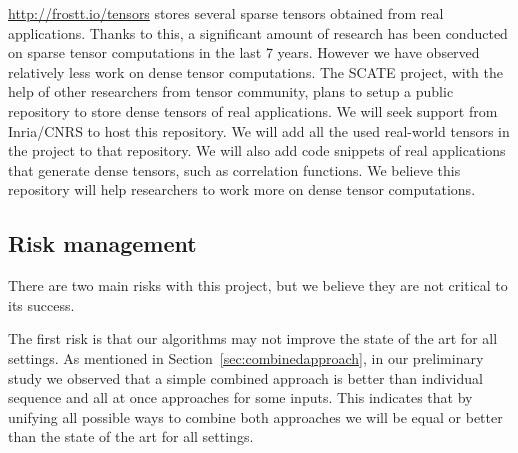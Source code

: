 \documentclass[a4paper,11pt]{article}
\begin{document}
	
	\medskip
	
	\noindent\url{http://frostt.io/tensors} stores several sparse tensors obtained from real applications. Thanks to this, a significant amount of research has been conducted on sparse tensor computations in the last 7 years. However we have observed relatively less work on dense tensor computations. The SCATE project, with the help of other researchers from tensor community, plans to setup a public repository to store dense tensors of real applications. We will seek support from Inria/CNRS to host this repository.
	We will add all the used real-world tensors in the project to that repository. We will also add code snippets of real applications that generate dense tensors, such as correlation functions. We believe this repository will help researchers to work more on dense tensor computations. 
	
	
	\subsection{Risk management}
	\label{sec:context:risk}
	
	There are two main risks with this project, but we believe they are not critical to its success.
	
	The first risk is that our algorithms may not improve the state of the art for all settings. As mentioned in Section~\ref{sec:combinedapproach}, in our preliminary study we observed that a simple combined approach is better than individual sequence and all at once approaches for some inputs. This indicates that by unifying all possible ways to combine both approaches we will be equal or better than the state of the art for all settings.
	
\end{document}
